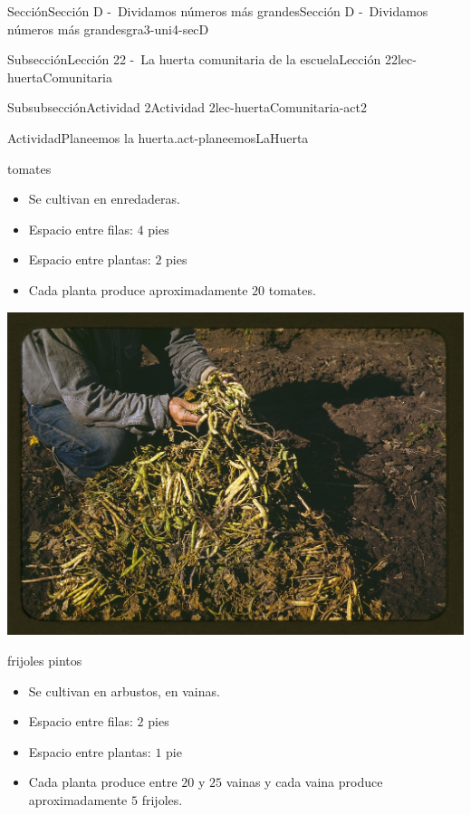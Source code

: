 \documentclass[twoside,10pt,]{article}
\begin{document}
\begin{sectionptx}{Sección}{Sección D -~Dividamos números más grandes}{}{Sección D -~Dividamos números más grandes}{}{}{gra3-uni4-secD}
\begin{subsectionptx}{Subsección}{Lección 22 -~La huerta comunitaria de la escuela}{}{Lección 22}{}{}{lec-huertaComunitaria}
\begin{subsubsectionptx}{Subsubsección}{Actividad 2}{}{Actividad 2}{}{}{lec-huertaComunitaria-act2}
\begin{activity}{Actividad}{Planeemos la huerta.}{act-planeemosLaHuerta}
\begin{sidebyside}{2}{0.025}{0.025}{0.05}
\begin{sbspanel}{0.45}
%
\par
tomates%
%
\begin{itemize}[label=\textbullet]
\item{}Se cultivan en enredaderas.%
\item{}Espacio entre filas: \(4\) pies%
\item{}Espacio entre plantas: \(2\) pies%
\item{}Cada planta produce aproximadamente \(20\) tomates.%
\end{itemize}
\end{sbspanel}%
\end{sidebyside}%
\begin{sidebyside}{2}{0.025}{0.025}{0.05}%
\begin{sbspanel}{0.45}%
\includegraphics[width=\linewidth]{external/jpg-source/3-4-D-22 Act2-frijoles-pintos.jpg}
%
\par
frijoles pintos%
%
\begin{itemize}[label=\textbullet]
\item{}Se cultivan en arbustos, en vainas.%
\item{}Espacio entre filas: \(2\) pies%
\item{}Espacio entre plantas: \(1\) pie%
\item{}Cada planta produce entre \(20\) y \(25\) vainas y cada vaina produce aproximadamente \(5\) frijoles.%
\end{itemize}
\end{sbspanel}%
\begin{sbspanel}{0.45}%

\end{sbspanel}
\end{sidebyside}
\end{activity}
\end{subsubsectionptx}
\end{subsectionptx}
\end{sectionptx}
\end{document}
